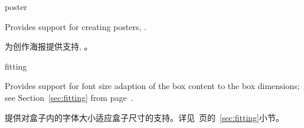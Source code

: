 \begin{docTcbKey}[library]{poster}{}{}

Provides support for creating posters, .

为创作海报提供支持, 。

\end{docTcbKey}















\begin{docTcbKey}[library]{fitting}{}{}

Provides support for font size adaption of the box content to
the box dimensions;
see Section~\ref{sec:fitting} from page~\pageref{sec:fitting}.

提供对盒子内的字体大小适应盒子尺寸的支持。详见~\pageref{sec:fitting}页的~\ref{sec:fitting}小节。

\end{docTcbKey}






